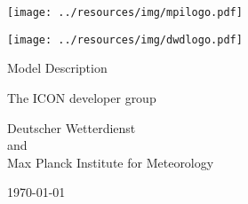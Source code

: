 \documentclass[DIV16,BCOR1cm,11pt,a4paper,twoside]{scrreprt}
\begin{document}
\pagestyle{empty}

\renewcommand{\footnoterule}{\rule{0pt}{0pt}\vspace{0pt}}

\begin{center}
\ifpdf
\parbox{2cm}{
\texttt{[image: ../resources/img/mpilogo.pdf]}
}
\hfill
\parbox{2cm}{
\texttt{[image: ../resources/img/dwdlogo.pdf]}
}
\fi
\end{center}

\vspace{2cm}

\begin{center}
{\sectfont\Huge
\color{mpggreen}Model Description\color{black}\\[0.5ex]
}
\end{center}

\vspace{2cm}

\begin{center}
{\sectfont\Large
The ICON  developer group}
\end{center}

\vspace{1cm}

\begin{center}
{\sectfont\Large
Deutscher Wetterdienst\\and\\
Max Planck Institute for Meteorology\\

\vspace{1cm}

\today}
\end{center}
\cleardoublepage

\tableofcontents

\cleardoublepage
\pagestyle{plain}





%



\end{document}
